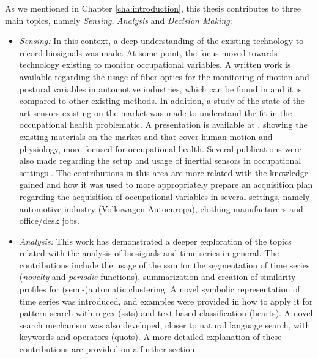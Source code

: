 As we mentioned in Chapter \ref{cha:introduction}, this thesis contributes to three main topics, namely \textit{Sensing}, \textit{Analysis} and \textit{Decision Making}:
\begin{itemize}
\item \textit{Sensing:} In this context, a deep understanding of the existing technology to record biosignals was made. At some point, the focus moved towards technology existing to monitor occupational variables. A written work is available regarding the usage of fiber-optics for the monitoring of motion and postural variables in automotive industries, which can be found in \cite{fiber_optics} and it is compared to other existing methods. In addition, a study of the state of the art sensors existing on the market was made to understand the fit in the occupational health problematic. A presentation is available at \cite{sensors_slides}, showing the existing materials on the market and that cover human motion and physiology, more focused for occupational health. Several publications were also made regarding the setup and usage of inertial sensors in occupational settings \cite{sara, santos2019, lua, microergo, sara_silva}. The contributions in this area are more related with the knowledge gained and how it was used to more appropriately prepare an acquisition plan regarding the acquisition of occupational variables in several settings, namely automotive industry (Volkswagen Autoeuropa), clothing manufacturers and office/desk jobs.\\

\item \textit{Analysis:} This work has demonstrated a deeper exploration of the topics related with the analysis of biosignals and time series in general. The contributions include the usage of the \gls{ssm} for the segmentation of time series (\textit{novelty} and \textit{periodic} functions), summarization and creation of similarity profiles for (semi-)automatic clustering. A novel symbolic representation of time series was introduced, and examples were provided in how to apply it for pattern search with \gls{regex} (\gls{ssts}) and text-based classification (\gls{hearts}). A novel search mechanism was also developed, closer to natural language search, with keywords and operators (\gls{quots}). A more detailed explanation of these contributions are provided on a further section.\\


\end{itemize}
